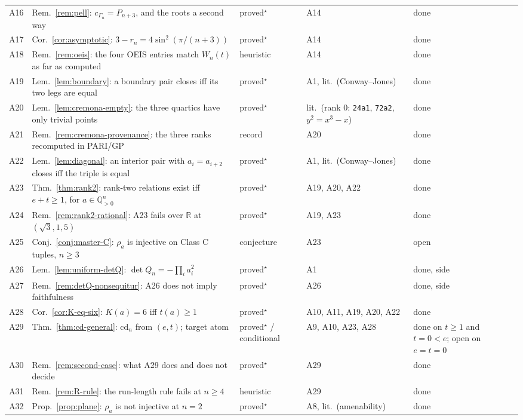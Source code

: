 \documentclass[11pt,a4paper]{article}
\newcommand{\R}{\mathbb{R}}
\newcommand{\Q}{\mathbb{Q}}
\newcommand{\cd}{\mathrm{cd}}
\theoremstyle{definition}
\theoremstyle{remark}
\theoremstyle{plain}
\begin{document}
\begin{longtable}{@{}l p{} p{} p{} p{}@{}}
A16 & Rem.~\ref{rem:pell}: $c_{\Gamma_n}=P_{n+3}$, and the roots a second way & proved$^\star$ & A14 & done \\
A17 & Cor.~\ref{cor:asymptotic}: $3-r_n=4\sin^2(\pi/(n+3))$ & proved$^\star$ & A14 & done \\
A18 & Rem.~\ref{rem:oeis}: the four OEIS entries match $W_n(t)$ as far as computed & heuristic & A14 & done \\
A19 & Lem.~\ref{lem:boundary}: a boundary pair closes iff its two legs are equal & proved$^\star$ & A1, lit.\ (Conway--Jones) & done \\
A20 & Lem.~\ref{lem:cremona-empty}: the three quartics have only trivial points & proved$^\star$ & lit.\ (rank $0$: \texttt{24a1}, \texttt{72a2}, $y^2=x^3-x$) & done \\
A21 & Rem.~\ref{rem:cremona-provenance}: the three ranks recomputed in PARI/GP & record & A20 & done \\
A22 & Lem.~\ref{lem:diagonal}: an interior pair with $a_i=a_{i+2}$ closes iff the triple is equal & proved$^\star$ & A1, lit.\ (Conway--Jones) & done \\
A23 & Thm.~\ref{thm:rank2}: rank-two relations exist iff $e+t\ge1$, for $a\in\Q_{>0}^n$ & proved$^\star$ & A19, A20, A22 & done \\
A24 & Rem.~\ref{rem:rank2-rational}: A23 fails over $\R$ at $(\sqrt3,1,5)$ & proved$^\star$ & A19, A23 & done \\
A25 & Conj.~\ref{conj:master-C}: $\rho_a$ is injective on Class C tuples, $n\ge3$ & conjecture & A23 & open \\
A26 & Lem.~\ref{lem:uniform-detQ}: $\det Q_n=-\prod_ia_i^2$ & proved$^\star$ & A1 & done, side \\
A27 & Rem.~\ref{rem:detQ-nonsequitur}: A26 does not imply faithfulness & proved$^\star$ & A26 & done, side \\
A28 & Cor.~\ref{cor:K-eq-six}: $K(a)=6$ iff $t(a)\ge1$ & proved$^\star$ & A10, A11, A19, A20, A22 & done \\
A29 & Thm.~\ref{thm:cd-general}: $\cd_n$ from $(e,t)$; target atom & proved$^\star$ / conditional & A9, A10, A23, A28 & done on $t\ge1$ and $t=0<e$; open on $e=t=0$ \\
A30 & Rem.~\ref{rem:second-case}: what A29 does and does not decide & proved$^\star$ & A29 & done \\
A31 & Rem.~\ref{rem:R-rule}: the run-length rule fails at $n\ge4$ & heuristic & A29 & done \\
A32 & Prop.~\ref{prop:plane}: $\rho_a$ is not injective at $n=2$ & proved$^\star$ & A8, lit.\ (amenability) & done \\

\end{longtable}
\end{document}

